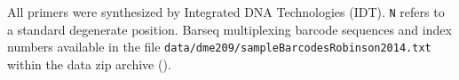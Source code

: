 All primers were synthesized by Integrated DNA Technologies (IDT).
\texttt{N} refers to a standard degenerate position.
\label{tab:indexbarcodes}
Barseq multiplexing barcode sequences and index numbers available in 
the file 
\texttt{data/dme209/sampleBarcodesRobinson2014.txt} within the
data zip archive (). \\

